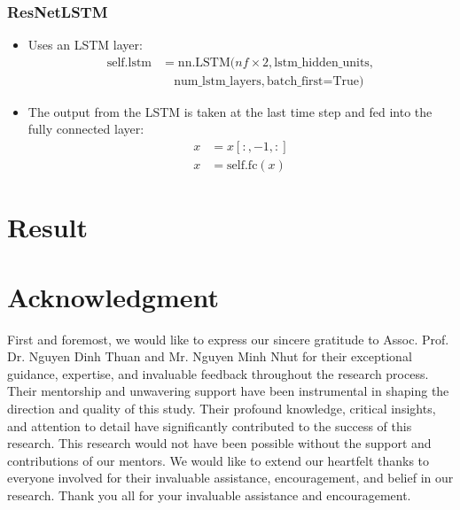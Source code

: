 \documentclass[conference]{IEEEtran}
\begin{document}
\begin{enumerate}
    \subsubsection{ResNetLSTM}
    \begin{itemize}
      \item Uses an LSTM layer: 
        \begin{align*}
          \text{self.lstm} &= \text{nn.LSTM}(nf \times 2, \text{lstm\_hidden\_units}, \\
                                          &\quad \text{num\_lstm\_layers}, \text{batch\_first=True})
        \end{align*}
      \item The output from the LSTM is taken at the last time step and fed into the fully connected layer: 
        \begin{align*}
          x &= x[:, -1, :] \\
          x &= \text{self.fc}(x)
        \end{align*}
    \end{itemize}

\end{enumerate}

\section{Result}


\section*{Acknowledgment}

First and foremost, we would like to express our sincere gratitude to Assoc. Prof. Dr. Nguyen Dinh Thuan and Mr. Nguyen Minh Nhut for their exceptional guidance, expertise, and invaluable feedback throughout the research process. Their mentorship and unwavering support have been instrumental in shaping the direction and quality of this study. Their profound knowledge, critical insights, and attention to detail have significantly contributed to the success of this research. This research would not have been possible without the support and contributions of our mentors. We would like to extend our heartfelt thanks to everyone involved for their invaluable assistance, encouragement, and belief in our research. Thank you all for your invaluable assistance and encouragement.
\end{document}

